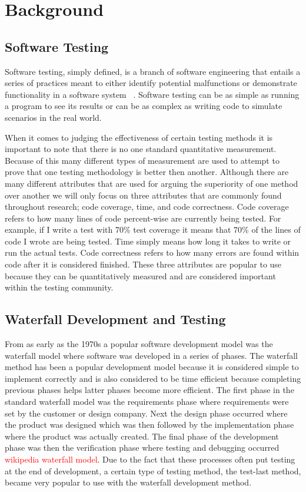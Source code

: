 \documentclass{sig-alternate}
\newcommand{\mycomment}[1]{\textcolor{red}{#1}}
\begin{document}
\section{Background}
\subsection{Software Testing}
Software testing, simply defined, is a branch of software engineering that entails a series of practices meant to either identify potential malfunctions or demonstrate functionality in a software system ~\cite{Bertolino:2007}.  Software testing can be as simple as running a program to see its results or can be as complex as writing code to simulate scenarios in the real world.

When it comes to judging the effectiveness of certain testing methods it is important to note that there is no one standard quantitative measurement.  Because of this many different types of measurement are used to attempt to prove that one testing methodology is better then another.  Although there are many different attributes that are used for arguing the superiority of one method over another we will only focus on three attributes that are commonly found throughout research; code coverage, time, and code correctness.  Code coverage refers to how many lines of code percent-wise are currently being tested. For example, if I write a test with 70\% test coverage it means that 70\% of the lines of code I wrote are being tested.  Time simply means how long it takes to write or run the actual tests.  Code correctness refers to how many errors are found within code after it is considered finished.  These three attributes are popular to use because they can be quantitatively measured and are considered important within the testing community. 

\subsection{Waterfall Development and Testing}

From as early as the 1970s a popular software development model was the waterfall model where software was developed in a series of phases.  The waterfall method has been a popular development model because it is considered simple to implement correctly and is also considered to be time efficient because completing previous phases helps latter phases become more efficient. The first phase in the standard waterfall model was the requirements phase where requirements were set by the customer or design company.  Next the design phase occurred where the product was designed which was then followed by the implementation phase where the product was actually created.  The final phase of the development phase was then the verification phase where testing and debugging occurred \mycomment{wikipedia waterfall model}.  Due to the fact that these processes often put testing at the end of development, a certain type of testing method, the test-last method, became very popular to use with the waterfall development method.
\end{document}
